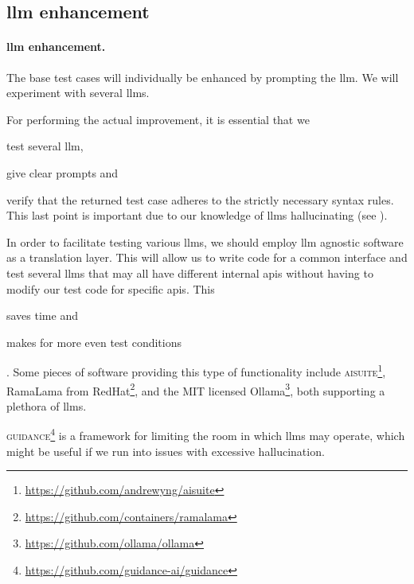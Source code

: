\subsection{\acrshort{llm} enhancement}\label{sec:llmEnhancement}

\paragraph{\acrshort{llm} enhancement.} The base test cases will
individually be enhanced by prompting the \acrshort{llm}. We will experiment with several
\acrshort{llms}.

For performing the actual improvement, it is essential that we \begin{inparaenum}
    \item test several \acrshort{llm},
    \item give clear prompts
    and
    \item verify that the returned test case adheres to the strictly necessary
    syntax rules. This last point is important due to our knowledge of
    \acrshort{llms} hallucinating (see ).
\end{inparaenum}

In order to facilitate testing various \acrlong{llms}, we should employ
\acrshort{llm} agnostic software as a translation layer. This will allow us to
write code for a common interface and test several \acrshort{llms} that may all
have different internal \acrfull{apis} without having to modify our test code
for specific \acrshort{apis}. This \begin{inparaenum}
    \item saves time
    and
    \item makes for more even test conditions \end{inparaenum}. Some pieces of software providing
this type of functionality include
\textsc{aisuite}\footnote{\url{https://github.com/andrewyng/aisuite}}, RamaLama from
RedHat\footnote{\url{https://github.com/containers/ramalama}}, and the MIT licensed
Ollama\footnote{\url{https://github.com/ollama/ollama}}, both supporting a plethora of
\acrlong{llms}.

\textsc{guidance}\footnote{\url{https://github.com/guidance-ai/guidance}} is a
framework for limiting the room in which \acrshort{llms} may operate, which
might be useful if we run into issues with excessive hallucination.


